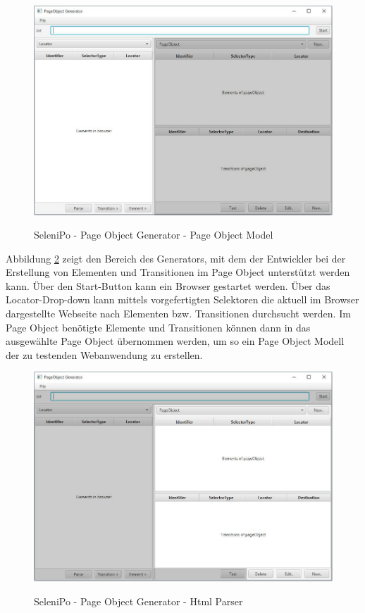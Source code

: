\begin{figure}[htb]
  \centering  
  \includegraphics[scale=0.5]{img/poGeneratorPo.JPG}\\
  \caption{SeleniPo - Page Object Generator - Page Object Model}
  \label{fig:poGeneratorPo}
\end{figure}

\newpage

Abbildung \ref{fig:poGeneratorHtml} zeigt den Bereich des Generators, mit dem der Entwickler bei der Erstellung von Elementen und Transitionen im Page Object unterstützt werden kann.
Über den Start-Button kann ein Browser gestartet werden. Über das Locator-Drop-down kann mittels vorgefertigten Selektoren die aktuell im Browser dargestellte Webseite nach Elementen bzw. Transitionen durchsucht werden. Im Page Object benötigte Elemente und Transitionen können dann in das ausgewählte Page Object übernommen werden, um so ein Page Object Modell der zu testenden Webanwendung zu erstellen.

\begin{figure}[htb]
  \centering  
  \includegraphics[scale=0.5]{img/poGeneratorHtml.JPG}\\
  \caption{SeleniPo - Page Object Generator - Html Parser}
  \label{fig:poGeneratorHtml}
\end{figure}


